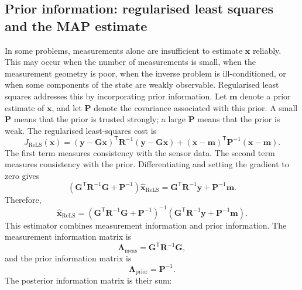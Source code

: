 \subsection{Prior information: regularised least squares and the MAP estimate}
In some problems, measurements alone are insufficient to estimate $\mathbf{x}$ reliably. This may occur when the number of measurements is small, when the measurement geometry is poor, when the inverse problem is ill-conditioned, or when some components of the state are weakly observable. Regularised least squares addresses this by incorporating prior information. Let $\mathbf{m}$ denote a prior estimate of $\mathbf{x}$, and let $\mathbf{P}$ denote the covariance associated with this prior. A small $\mathbf{P}$ means that the prior is trusted strongly; a large $\mathbf{P}$ means that the prior is weak. The regularised least-squares cost is
\begin{equation}
J_{\mathrm{ReLS}}(\mathbf{x}) = \left( \mathbf{y} - \mathbf{G}\mathbf{x} \right)^{\mathsf T} \mathbf{R}^{-1} \left( \mathbf{y} - \mathbf{G}\mathbf{x} \right) + \left( \mathbf{x} - \mathbf{m} \right)^{\mathsf T} \mathbf{P}^{-1} \left( \mathbf{x} - \mathbf{m} \right).
\end{equation}
The first term measures consistency with the sensor data. The second term measures consistency with the prior. Differentiating and setting the gradient to zero gives
\begin{equation}
\left(
\mathbf{G}^{\mathsf T}
\mathbf{R}^{-1}
\mathbf{G}
+
\mathbf{P}^{-1}
\right)
\widehat{\mathbf{x}}_{\mathrm{ReLS}}
=
\mathbf{G}^{\mathsf T}
\mathbf{R}^{-1}
\mathbf{y}
+
\mathbf{P}^{-1}
\mathbf{m}.
\end{equation}
Therefore,
\begin{equation}
\widehat{\mathbf{x}}_{\mathrm{ReLS}}
=
\left(
\mathbf{G}^{\mathsf T}
\mathbf{R}^{-1}
\mathbf{G}
+
\mathbf{P}^{-1}
\right)^{-1}
\left(
\mathbf{G}^{\mathsf T}
\mathbf{R}^{-1}
\mathbf{y}
+
\mathbf{P}^{-1}
\mathbf{m}
\right).
\end{equation}
This estimator combines measurement information and prior information. The measurement information matrix is
\begin{equation}
\mathbf{\Lambda}_{\mathrm{meas}}
=
\mathbf{G}^{\mathsf T}
\mathbf{R}^{-1}
\mathbf{G},
\end{equation}
and the prior information matrix is
\begin{equation}
\mathbf{\Lambda}_{\mathrm{prior}}
=
\mathbf{P}^{-1}.
\end{equation}
The posterior information matrix is their sum:
